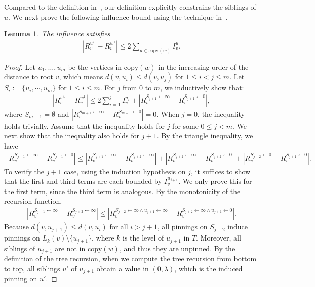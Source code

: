 \documentclass[11pt]{amsart}
\newtheorem{lemma}[theorem]{Lemma}
\theoremstyle{definition}
\theoremstyle{remark}
\begin{document}
Compared to the definition in~\cite{ALO24}, our definition explicitly constrains the siblings of $u$. We next prove the following influence bound using the technique in~\cite{ALO24}.

\begin{lemma}\label{lemma:influence-bound-one-vertex}
    The influence satisfies
    \begin{align*}
    |R_v^{w^0} - R_v^{w^1}| \leq 2\sum_{u \in \text{copy}(w)} I_v^u.
    \end{align*}
\end{lemma}
\begin{proof}
Let $u_1, \ldots, u_m$ be the vertices in $\text{copy}(w)$ in the increasing order of the distance to root $v$, which means $d(v,u_i)\leq d(v,u_j)$ for $1\leq i<j\leq m$.
Let $S_i:=\{u_i,\cdots,u_m\}$ for $1\leq i\leq m$.
For $j$ from $0$ to $m$, we inductively show that:
\begin{align*}
    |R_v^{w^0} - R_v^{w^1}|\leq 2\sum_{i=1}^{j} I_v^{u_i}+|R_v^{S_{j+1}\gets \infty} - R_v^{S_{j+1}\gets 0}|,
\end{align*}
where $S_{m+1}=\emptyset$ and $|R_v^{S_{m+1}\gets \infty}-R_v^{S_{m+1}\gets 0}|=0$. When $j=0$, the inequality holds trivially. Assume that the inequality holds for $j$ for some $0\leq j<m$. We next show that the inequality also holds for $j+1$. 
By the triangle inequality, we have
\begin{align*}
|R_v^{S_{j+1}\gets \infty} - R_v^{S_{j+1}\gets 0}|\leq |R_v^{S_{j+1}\gets \infty} - R_v^{S_{j+2}\gets \infty}|+|R_v^{S_{j+2}\gets \infty} - R_v^{S_{j+2}\gets 0}|+|R_v^{S_{j+2}\gets 0} - R_v^{S_{j+1}\gets 0}|.   
\end{align*}
To verify the $j+1$ case, using the induction hypothesis on $j$, it suffices to show that the first and third terms are each bounded by $I_v^{u_{j+1}}$. We only prove this for the first term, since the third term is analogous.
By the monotonicity of the recursion function,
\begin{align*}
|R_v^{S_{j+1}\gets \infty} - R_v^{S_{j+2}\gets \infty}|\leq |R_v^{S_{j+2}\gets \infty\land u_{j+1}\gets\infty } - R_v^{S_{j+2}\gets \infty\land u_{j+1}\gets 0}|.
\end{align*}
Because $d(v,u_{j+1}) \leq d(v,u_i)$ for all $i > j+1$, all pinnings on $S_{j+2}$ induce pinnings on $L_k(v) \setminus \{u_{j+1}\}$, where $k$ is the level of $u_{j+1}$ in $T$. Moreover, all siblings of $u_{j+1}$ are not in $\text{copy}(w)$, and thus they are unpinned. By the definition of the tree recursion, when we compute the tree recursion from bottom to top, all siblings $u'$ of $u_{j+1}$ obtain a value in $(0,\lambda)$, which is the induced pinning on $u'$. 

\end{proof}
\end{document}
